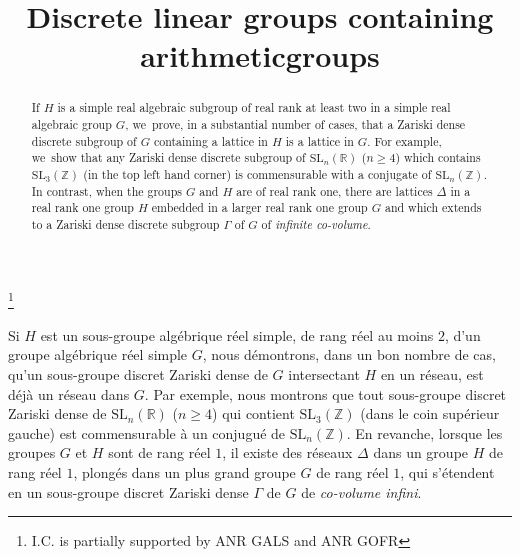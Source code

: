 \documentclass[JEP,XML,SOM,Unicode,published]{cedram}
\theoremstyle{definition}
\begin{document}
\frontmatter
\title{Discrete linear groups containing arithmetic\nobreakspace groups}

\author[\initial{I.} \lastname{Chatterji}]{ }
\address{Laboratoire J. A. Dieudonné, Université Côte d'Azur, CNRS UMR 7351,\\
Parc Valrose 06108 Nice Cedex 2, France}

\author[\initial{T. N.} \lastname{Venkataramana}]{ }
\address{Department of Mathematics, International Centre for Theoretical Sciences,\\
Bangalore 560 089, India}

\thanks{I.C. is partially supported by ANR GALS and ANR GOFR}

\begin{abstract}
If $H$ is a simple real algebraic subgroup of real rank at least two in a simple real algebraic group $G$, we~prove, in a substantial number of cases, that a Zariski dense discrete subgroup of $G$ containing a lattice in $H$ is a lattice in $G$. For example, we~show that any Zariski dense discrete subgroup of $\mathrm{SL}_n(\mathbb{R})$ ($n\geq 4$) which contains $\mathrm{SL}_3(\mathbb{Z})$ (in the top left hand corner) is commensurable with a conjugate of $\mathrm{SL}_n(\mathbb{Z})$. In contrast, when the groups $G$ and $H$ are of real rank one, there are lattices $\Delta$ in a real rank one group $H$ embedded in a larger real rank one group $G$ and which extends to a Zariski dense discrete subgroup $\Gamma $ of $G$ of \emph{infinite co-volume}.
\end{abstract}





\begin{altabstract}
Si $H$ est un sous-groupe algébrique réel simple, de rang réel au moins $2$, d’un groupe algébrique réel simple $G$, nous démontrons, dans un bon nombre de cas, qu’un sous-groupe discret Zariski dense de $G$ intersectant $H$ en un réseau, est déjà un réseau dans $G$. Par exemple, nous montrons que tout sous-groupe discret Zariski dense de $\mathrm{SL}_n(\mathbb{R})$ ($n \geq 4$) qui contient $\mathrm{SL}_3(\mathbb{Z})$ (dans le coin supérieur gauche) est commensurable à un conjugué de $\mathrm{SL}_n(\mathbb{Z})$. En revanche, lorsque les groupes $G$ et $H$ sont de rang réel $1$, il existe des réseaux $\Delta$ dans un groupe $H$ de rang réel $1$, plongés dans un plus grand groupe $G$ de rang réel $1$, qui s’étendent en un sous-groupe discret Zariski dense $\Gamma$ de $G$ de \emph{co-volume infini}.
\end{altabstract}
\maketitle
\end{document}
